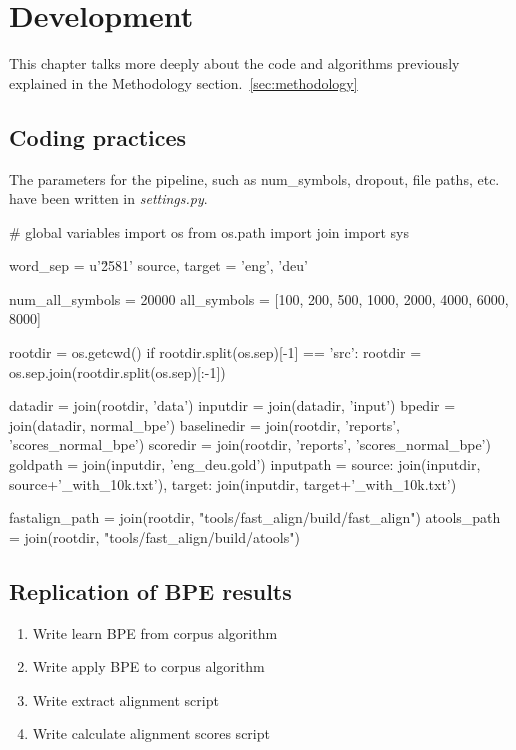 %
%

\chapter{Development}\label{ch:development}

This chapter talks more deeply about the code and algorithms previously explained in the Methodology section.~\ref{sec:methodology}

\section{Coding practices}

The parameters for the pipeline, such as num\_symbols, dropout, file paths, etc. have been written in \emph{settings.py}.

\begin{python}
# global variables
import os
from os.path import join
import sys

word_sep = u'\u2581'
source, target = 'eng', 'deu'

num_all_symbols = 20000
all_symbols = [100, 200, 500, 1000, 2000, 4000, 6000, 8000]

rootdir = os.getcwd()
if rootdir.split(os.sep)[-1] == 'src':
    rootdir = os.sep.join(rootdir.split(os.sep)[:-1])

datadir = join(rootdir, 'data')
inputdir = join(datadir, 'input')
bpedir = join(datadir, normal_bpe')
baselinedir = join(rootdir, 'reports', 'scores_normal_bpe')
scoredir = join(rootdir, 'reports', 'scores_normal_bpe')
goldpath = join(inputdir, 'eng_deu.gold')
inputpath = {source: join(inputdir, source+'_with_10k.txt'),
            target: join(inputdir, target+'_with_10k.txt')}

fastalign_path = join(rootdir, "tools/fast_align/build/fast_align")
atools_path = join(rootdir, "tools/fast_align/build/atools")
\end{python}

\section{Replication of BPE results}

\begin{enumerate}
    \item Write learn BPE from corpus algorithm
    \item Write apply BPE to corpus algorithm
    \item Write extract alignment script
    \item Write calculate alignment scores script
\end{enumerate}

